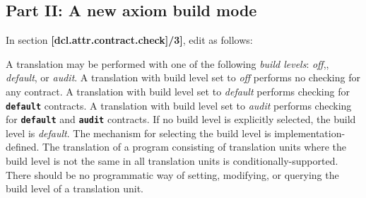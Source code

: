 \subsection{Part II: A new axiom build mode}

In section \textbf{[dcl.attr.contract.check]/3]}, edit as follows:

\vspace{2em}

{\addtolength{\leftskip}{5em}
A translation may be performed with one of the following \emph{build levels}: 
\emph{off},, \emph{default}, or \emph{audit}. 
A translation with build level set to \emph{off}  performs no checking for any contract.
A translation with build level set to \emph{default} performs checking for \textbf{\texttt{default}} contracts. 
A translation with build level set to \emph{audit} performs checking for \textbf{\texttt{default}} and 
\textbf{\texttt{audit}} contracts. 
If no build level is explicitly selected, the build level is \emph{default}. 
The mechanism for selecting the build level is implementation-defined. 
The translation of a program consisting of translation units where the build level is not the same in all translation units is conditionally-supported. 
There should be no programmatic way of setting, modifying, or querying the build level of a translation unit.
}
